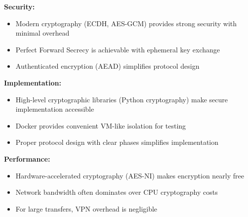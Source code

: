 \documentclass[12pt,a4paper]{article}
\begin{document}
\textbf{Security:}

\begin{itemize}
    \item Modern cryptography (ECDH, AES-GCM) provides strong security with minimal overhead
    \item Perfect Forward Secrecy is achievable with ephemeral key exchange
    \item Authenticated encryption (AEAD) simplifies protocol design
\end{itemize}

\textbf{Implementation:}

\begin{itemize}
    \item High-level cryptographic libraries (Python cryptography) make secure implementation accessible
    \item Docker provides convenient VM-like isolation for testing
    \item Proper protocol design with clear phases simplifies implementation
\end{itemize}

\textbf{Performance:}

\begin{itemize}
    \item Hardware-accelerated cryptography (AES-NI) makes encryption nearly free
    \item Network bandwidth often dominates over CPU cryptography costs
    \item For large transfers, VPN overhead is negligible
\end{itemize}
\end{document}
